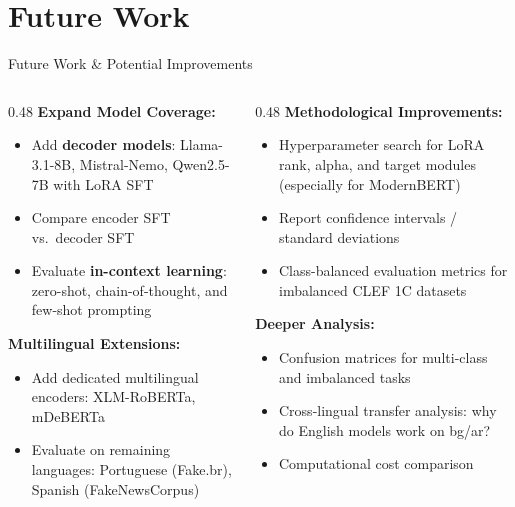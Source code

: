\documentclass[aspectratio=169]{beamer}
\begin{document}
\section{Future Work}

\begin{frame}{Future Work \& Potential Improvements}
  \begin{columns}[T]
    \begin{column}{0.48\textwidth}
      \textbf{Expand Model Coverage:}
      \begin{itemize}
        \item Add \textbf{decoder models}: Llama-3.1-8B, Mistral-Nemo, Qwen2.5-7B with LoRA SFT
        \item Compare encoder SFT vs.\ decoder SFT
        \item Evaluate \textbf{in-context learning}: zero-shot, chain-of-thought, and few-shot prompting
      \end{itemize}

      \vspace{0.3cm}
      \textbf{Multilingual Extensions:}
      \begin{itemize}
        \item Add dedicated multilingual encoders: XLM-RoBERTa, mDeBERTa
        \item Evaluate on remaining languages: Portuguese (Fake.br), Spanish (FakeNewsCorpus)
      \end{itemize}
    \end{column}
    \begin{column}{0.48\textwidth}
      \textbf{Methodological Improvements:}
      \begin{itemize}
        \item Hyperparameter search for LoRA rank, alpha, and target modules (especially for ModernBERT)
        \item Report confidence intervals / standard deviations
        \item Class-balanced evaluation metrics for imbalanced CLEF 1C datasets
      \end{itemize}

      \vspace{0.3cm}
      \textbf{Deeper Analysis:}
      \begin{itemize}
        \item Confusion matrices for multi-class and imbalanced tasks
        \item Cross-lingual transfer analysis: why do English models work on bg/ar?
        \item Computational cost comparison
      \end{itemize}
    \end{column}
  \end{columns}
\end{frame}
\end{document}

